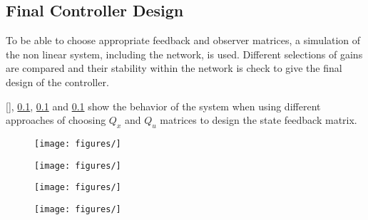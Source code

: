 \subsection{Final Controller Design}
To be able to choose appropriate feedback and observer matrices, a simulation of the non linear system, including the network, is used. Different selections of gains are compared and their stability within the network is check to give the final design of the controller.

\autoref{}, \ref{}, \ref{} and \ref{} show the behavior of the system when using different approaches of choosing $Q_x$ and $Q_u$ matrices to design the state feedback matrix.

\begin{minipage}{\linewidth}
    \begin{minipage}{0.6\linewidth}
        \begin{figure}[H]
            \texttt{[image: figures/]}
            \centering			
            \label{attitudeController1}
        \end{figure}
    \end{minipage}
    \hspace{0.03\linewidth}
    \begin{minipage}{0.4\linewidth}
        \begin{figure}[H]\vspace{20mm}
            \texttt{[image: figures/]}
            \centering \vspace{7mm}
            \label{attitudeController2}
        \end{figure}
    \end{minipage}
\end{minipage}
\begin{minipage}{\linewidth}
    \begin{minipage}{0.5\linewidth}
        \begin{figure}[H]
            \texttt{[image: figures/]}
            \centering			
            \label{attitudeController3}
        \end{figure}
    \end{minipage}
    \hspace{0.03\linewidth}
    \begin{minipage}{0.5\linewidth}
        \begin{figure}[H]
            \texttt{[image: figures/]}
            \centering
            \label{attitudeController4}
        \end{figure}
    \end{minipage}
\end{minipage}

